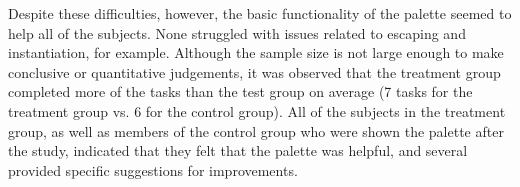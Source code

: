 \documentclass[10pt, conference, compsocconf]{IEEEtran}
\begin{document}
Despite these difficulties, however, the basic functionality of the palette seemed to help all of the subjects. None struggled with issues related to escaping and instantiation, for example. Although the sample size is not large enough to make conclusive or quantitative judgements, it was observed that the treatment group completed more of the tasks than the test group on average (7 tasks for the treatment group vs. 6 for the control group). All of the subjects in the treatment group, as well as members of the control group who were shown the palette after the study, indicated that they felt that the palette was helpful, and several provided specific suggestions for improvements.
%
%
%
%
\end{document}
